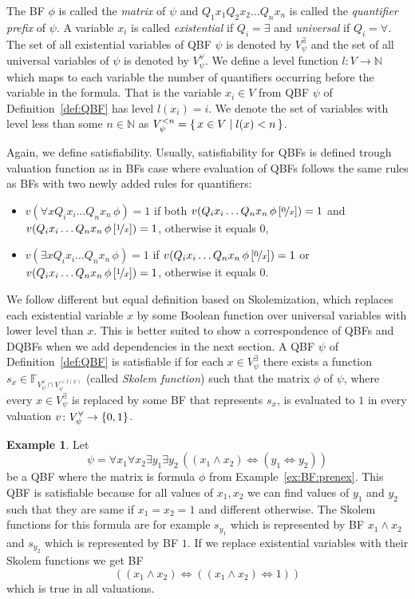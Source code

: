 \documentclass[
  digital, %
  twoside, %
  table,   %
  nolof,     %
  nolot,     %
]{fithesis3}
\let\setbuilder\set
\newcommand{\simpleset}[1]{\{{#1}\}}
\renewcommand{\set}[1]{\normalexpandarg\IfSubStr{#1}{|}{\setbuilder{#1}}{\simpleset{#1}}}
\theoremstyle{definition}
\newtheorem{example}{Example}
\theoremstyle{remark}
\newcommand{\substitute}[2]{\left[ \nicefrac{#2}{#1} \right]}
\newcommand{\BFuncs}[1]{\mathbb{F}_{#1}}
\newcommand{\evars}[1]{V_{#1}^{\exists}}
\newcommand{\uvars}[1]{V_{#1}^{\forall}}
\newcommand{\lequal}{\Leftrightarrow}
\newcommand{\itholds}{\,}
\begin{document}
The BF $\phi$ is called the \emph{matrix} of $\psi$ and $Q_1 x_1 Q_2 x_2 \dots Q_n x_n$ is called the \emph{quantifier prefix} of $\psi$. A variable $x_i$ is called \emph{existential} if $Q_i = \exists$ and \emph{universal} if $Q_i = \forall$. The set of all existential variables of QBF $\psi$ is denoted by $\evars{\psi}$ and the set of all universal variables of $\psi$ is denoted by $\uvars{\psi}$. We define a level function $l\colon V \to \mathbb{N}$ which maps to each variable the number of quantifiers occurring before the variable in the formula. That is the variable $x_i \in V$ from QBF $\psi$ of Definition~\ref{def:QBF} has level $l(x_i) = i$. We denote the set of variables with level less than some $n \in \mathbb{N}$ as $V_{\psi}^{<n} = \set{x \in V | l(x) < n}$.

Again, we define satisfiability. Usually, satisfiability for QBFs is defined trough valuation function as in BFs case where evaluation of QBFs follows the same rules as BFs with two newly added rules for quantifiers:
\begin{itemize}
    \item $v(\forall x Q_i x_i \dots Q_n x_n \itholds \phi) = 1$ if both $v(Q_i x_i \dots Q_n x_n \itholds \phi\substitute{x}{0}) = 1$ and $v(Q_i x_i \dots Q_n x_n \itholds \phi\substitute{x}{1}) = 1$, otherwise it equals $0$,
    \item $v(\exists x Q_i x_i \dots Q_n x_n \itholds \phi) = 1$ if $v(Q_i x_i \dots Q_n x_n \itholds \phi\substitute{x}{0}) = 1$ or \\ $v(Q_i x_i \dots Q_n x_n \itholds \phi\substitute{x}{1}) = 1$, otherwise it equals $0$.
\end{itemize}
We follow different but equal definition based on Skolemization, which replaces each existential variable $x$ by some Boolean function over universal variables with lower level than $x$. This is better suited to show a correspondence of QBFs and DQBFs when we add dependencies in the next section. A QBF $\psi$ of Definition~\ref{def:QBF} is satisfiable if for each $x \in V_{\psi}^{\exists}$ there exists a function $s_{x} \in \BFuncs{\uvars{\psi}\cap V_{\psi}^{<l(x)}}$ (called \emph{Skolem function}) such that the matrix $\phi$ of $\psi$, where every $x \in \evars{\psi}$ is replaced by some BF that represents $s_x$, is evaluated to $1$ in every valuation $v\colon \uvars{\psi} \to \set{0,1}$.

\begin{example}
\label{ex:QBF:prenex}
Let 
\[\psi = \forall x_1 \forall x_2 \exists y_1  \exists y_2 \itholds ((x_1 \land x_2) \lequal (y_1 \lequal y_2))\]
be a QBF where the matrix is formula $\phi$ from Example~\ref{ex:BF:prenex}. This QBF is satisfiable because for all values of $x_1, x_2$ we can find values of $y_1$ and $y_2$ such that they are same if $x_1 = x_2 = 1$ and different otherwise. The Skolem functions for this formula are for example $s_{y_1}$ which is represented by BF $x_1 \land x_2$ and $s_{y_2}$ which is represented by BF $1$. If we replace existential variables with their Skolem functions we get BF
\[((x_1 \land x_2) \lequal ((x_1 \land x_2) \lequal 1))\]
which is true in all valuations.
\end{example}
\end{document}
